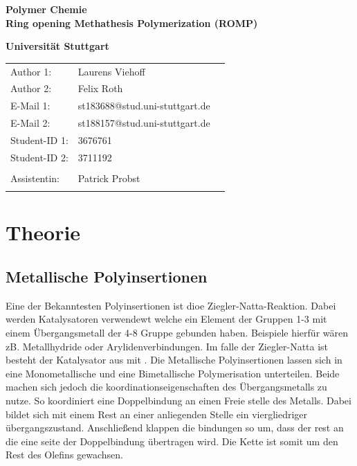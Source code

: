 \documentclass[10pt,a4paper,ngerman]{scrartcl}
\begin{document}
\begin{titlepage}
	\vspace*{2,5cm}
	\begin{center}
		\begin{LARGE}
			\textbf{Polymer Chemie}\\
			\textbf{Ring opening Methathesis Polymerization (ROMP)}\\
		\end{LARGE}
		\vspace{1cm}
		\textbf{Universität Stuttgart}\\
		\vspace*{1,5cm}
		\begin{tabular}{lp{}l}
			Author 1:     &Laurens Viehoff\\
            Author 2:     &Felix Roth\\   
			E-Mail 1:      &st183688@stud.uni-stuttgart.de\\
            E-Mail 2:      &st188157@stud.uni-stuttgart.de  \\
			Student-ID 1: & 3676761   \\ 
            Student-ID 2: & 3711192 \\ \\
			Assistentin:  & Patrick Probst  \\ \\ 
		\end{tabular}
	\end{center}

    
\end{titlepage}
\thispagestyle{empty}
\renewcommand{\thepage}{\arabic{page}}
\newpage
\tableofcontents
\setcounter{page}{1}
\renewcommand{\thepage}{\arabic{page}}
\newpage


\section{Theorie}

	\subsection{Metallische Polyinsertionen}

		Eine der Bekanntesten Polyinsertionen ist dioe Ziegler-Natta-Reaktion.
		Dabei werden Katalysatoren verwendewt welche ein Element der Gruppen 1-3 mit einem Übergangsmetall der 4-8 Gruppe gebunden haben.
		Beispiele hierfür wären zB. Metallhydride oder Arylidenverbindungen. 
		Im falle der Ziegler-Natta ist besteht der Katalysator aus  mit .
		Die Metallische Polyinsertionen lassen sich in eine Monometallische und eine Bimetallische Polymerisation unterteilen.
		Beide machen sich jedoch die koordinationseigenschaften des Übergangsmetalls zu nutze.
		So koordiniert eine Doppelbindung an einen Freie stelle des Metalls. 
		Dabei bildet sich mit einem Rest an einer anliegenden Stelle ein viergliedriger übergangszustand.
		Anschließend klappen die bindungen so um, dass der rest an die eine seite der Doppelbindung übertragen wird.
		Die Kette ist somit um den Rest des Olefins gewachsen.
\end{document}
